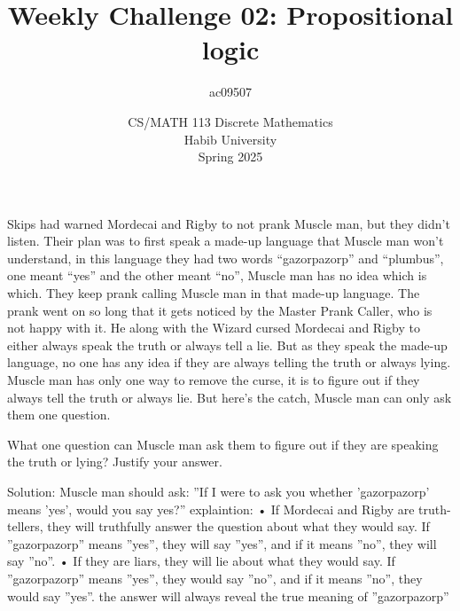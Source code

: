 \documentclass[a4paper]{exam}
\title{Weekly Challenge 02: Propositional logic}
\author{ac09507} %
\date{CS/MATH 113 Discrete Mathematics\\Habib University\\Spring 2025}
\begin{document}
\maketitle

\begin{questions}
  
Skips had warned Mordecai and Rigby to not prank Muscle man, but they didn't listen.
Their plan was to first speak a made-up language that Muscle man won't understand, in this language they had two words ``gazorpazorp'' and ``plumbus'', one meant ``yes'' and the other meant ``no'', Muscle man has no idea which is which. They keep prank calling Muscle man in that made-up language.
The prank went on so long that it gets noticed by the Master Prank Caller, who is not happy with it. He along with the Wizard cursed Mordecai and Rigby to either always speak the truth or always tell a lie. But as they speak the made-up language, no one has any idea if they are always telling the truth or always lying. Muscle man has only one way to remove the curse, it is to figure out if they always tell the truth or always lie. But here's the catch, Muscle man can only ask them one question. 

What one question can Muscle man ask them to figure out if they are speaking the truth or lying? Justify your answer.
\begin{solution}
    Solution: Muscle man should ask: ”If I were to ask you whether ’gazorpazorp’
means ’yes’, would you say yes?”
explaintion:
• If Mordecai and Rigby are truth-tellers, they will truthfully answer the question
about what they would say. If ”gazorpazorp” means ”yes”, they will say ”yes”,
and if it means ”no”, they will say ”no”.
• If they are liars, they will lie about what they would say. If ”gazorpazorp” means
”yes”, they would say ”no”, and if it means ”no”, they would say ”yes”.
the answer will always reveal the true meaning of ”gazorpazorp”
\end{solution}


\end{questions}
\end{document}
